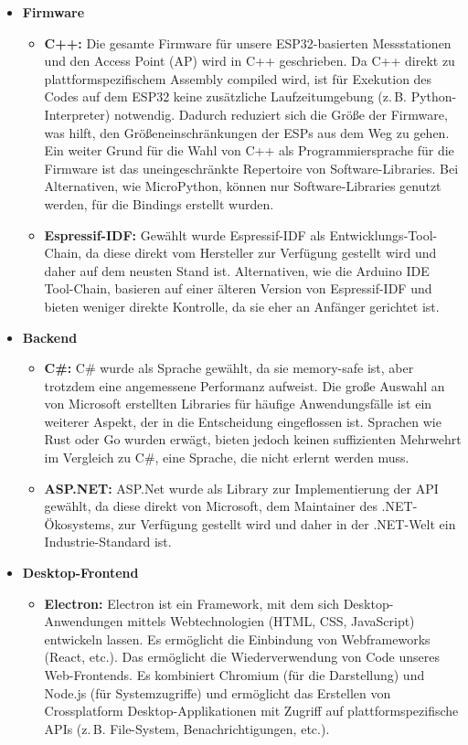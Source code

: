 \documentclass{article}
\begin{document}
\begin{itemize}
  \item \textbf{Firmware}
    \begin{itemize}
      \item \textbf{C++:} Die gesamte Firmware für unsere ESP32-basierten Messstationen und den Access Point (AP) wird in C++ geschrieben. Da C++ direkt zu plattformspezifischem Assembly compiled wird, ist für Exekution des Codes auf dem ESP32 keine zusätzliche Laufzeitumgebung (z.\,B. Python-Interpreter) notwendig. Dadurch reduziert sich die Größe der Firmware, was hilft, den Größeneinschränkungen der ESPs aus dem Weg zu gehen. Ein weiter Grund für die Wahl von C++ als Programmiersprache für die Firmware ist das uneingeschränkte Repertoire von Software-Libraries. Bei Alternativen, wie MicroPython, können nur Software-Libraries genutzt werden, für die Bindings erstellt wurden.
      \item \textbf{Espressif-IDF:} Gewählt wurde Espressif-IDF als Entwicklungs-Tool-Chain, da diese direkt vom Hersteller zur Verfügung gestellt wird und daher auf dem neusten Stand ist. Alternativen, wie die Arduino IDE Tool-Chain, basieren auf einer älteren Version von Espressif-IDF und bieten weniger direkte Kontrolle, da sie eher an Anfänger gerichtet ist.
    \end{itemize}

\pagebreak

  \item \textbf{Backend}
    \begin{itemize}
      \item \textbf{C\#:} C\# wurde als Sprache gewählt, da sie memory-safe ist, aber trotzdem eine angemessene Performanz aufweist. Die große Auswahl an von Microsoft erstellten Libraries für häufige Anwendungsfälle ist ein weiterer Aspekt, der in die Entscheidung eingeflossen ist. Sprachen wie Rust oder Go wurden erwägt, bieten jedoch keinen suffizienten Mehrwehrt im Vergleich zu C\#, eine Sprache, die nicht erlernt werden muss.
      \item \textbf{ASP.NET:} ASP.Net wurde als Library zur Implementierung der API gewählt, da diese direkt von Microsoft, dem Maintainer des .NET-Ökosystems, zur Verfügung gestellt wird und daher in der .NET-Welt ein Industrie-Standard ist.
    \end{itemize}

  \item \textbf{Desktop-Frontend}
    \begin{itemize}
      \item \textbf{Electron:} Electron ist ein Framework, mit dem sich Desktop-Anwendungen mittels Webtechnologien (HTML, CSS, JavaScript) entwickeln lassen. Es ermöglicht die Einbindung von Webframeworks (React, etc.). Das ermöglicht die Wiederverwendung von Code unseres Web-Frontends. Es kombiniert Chromium (für die Darstellung) und Node.js (für Systemzugriffe) und ermöglicht das Erstellen von Crossplatform Desktop-Applikationen mit Zugriff auf plattformspezifische APIs (z.\,B. File-System, Benachrichtigungen, etc.).
    \end{itemize}


\end{itemize}
\end{document}
